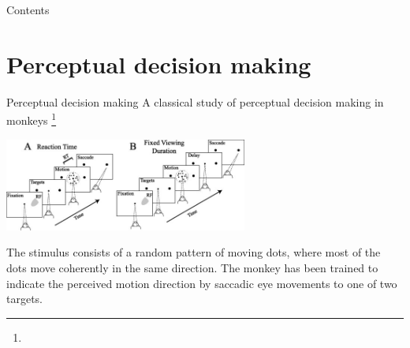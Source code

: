 \documentclass[xcolor=table,dvipsnames,svgnames,aspectratio=169,fontset=fandol]{ctexbeamer}
\begin{document}

\begin{frame}{Contents}
  \tableofcontents[hideallsubsections]
\end{frame}

%

\section{Perceptual decision making}

%
\begin{frame}{Perceptual decision making}
  A classical study of perceptual decision making in monkeys \footnote{}
  
  \begin{center}
  \includegraphics[width=0.6\textwidth,height=0.4\textheight]{monkey.png}
  \end{center}

  The stimulus consists of a random pattern of moving dots, where most of the dots move coherently in the same direction. The monkey has been trained to indicate the perceived motion direction by saccadic eye movements to one of two targets.
\end{frame}
\end{document}
